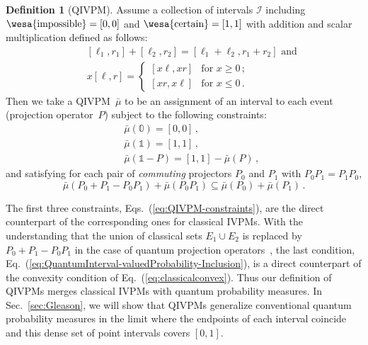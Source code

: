 \documentclass[english,reprint, aps, prl,superscriptaddress, showpacs,
showkeys, longbibliography, amsmath, amssymb]{revtex4-1}
\theoremstyle{plain}
\theoremstyle{definition}
\newtheorem{definition}{Definition}
\newcommand{\imposs}{{\text{\wesa{impossible}}}}
\newcommand{\necess}{{\text{\wesa{certain}}}}
\begin{document}
\begin{definition}[QIVPM]
  Assume a collection of intervals $\mathscr{I}$ including
  $\imposs=[0,0]$ and $\necess=[1,1]$ with addition and scalar
  multiplication defined as follows:
  \begin{subequations}\label{eq:interval-operations}
  \begin{eqnarray}
   &  & [\ell_{1},r_{1}]+[\ell_{2},r_{2}]=[\ell_{1}+\ell_{2},r_{1}+r_{2}]\textrm{ and}\\
   &  & x[\ell,r]=\begin{cases}
  [x\ell,xr] & \textrm{for }x\ge0\,;\\{}
  [xr,x\ell] & \textrm{for }x\le0\,.
  \end{cases}
  \end{eqnarray}
  \end{subequations}
  Then we take a QIVPM~$\bar{\mu}$ to be an assignment of an interval to each
  event (projection operator~$P$) subject to the following constraints:
  \begin{subequations}\label{eq:QIVPM-constraints}
  \begin{eqnarray}
   &  & \bar{\mu}(\mathbb{0})=\left[0,0\right]\,,\\
   &  & \bar{\mu}(\mathbb{1})=\left[1,1\right]\,,\\
   &  & \bar{\mu}\left(\mathbb{1}-P\right)=\left[1,1\right]-\bar{\mu}\left(P\right)\,,
  \end{eqnarray}
  \end{subequations}
  and satisfying for each pair of \emph{commuting} projectors $P_0$
  and $P_1$ with $P_0P_1=P_1P_0$,
\begin{equation}
\bar{\mu}\left(P_{0}+P_{1}-P_{0}P_{1}\right)+\bar{\mu}\left(P_{0}P_{1}\right)\subseteq\bar{\mu}\left(P_{0}\right)+\bar{\mu}\left(P_{1}\right)\,.
\label{eq:QuantumInterval-valuedProbability-Inclusion}
\end{equation}
\end{definition}
\noindent The first three constraints,
Eqs.~(\ref{eq:QIVPM-constraints}), are the direct counterpart of the
corresponding ones for classical IVPMs.  With the understanding that
the union of classical sets $E_1\cup E_2$ is replaced by
$P_0+P_1-P_0P_1$ in the case of quantum projection
operators~\cite{Griffiths2003}, the last condition,
Eq.~(\ref{eq:QuantumInterval-valuedProbability-Inclusion}), is a
direct counterpart of the convexity condition of
Eq.~(\ref{eq:classicalconvex}). Thus our definition of QIVPMs merges
classical IVPMs with quantum probability measures. In
Sec.~\ref{sec:Gleason}, we will show that QIVPMs generalize
conventional quantum probability measures in the limit where the
endpoints of each interval coincide and this dense set of point
intervals covers $[0,1]$.
\end{document}
